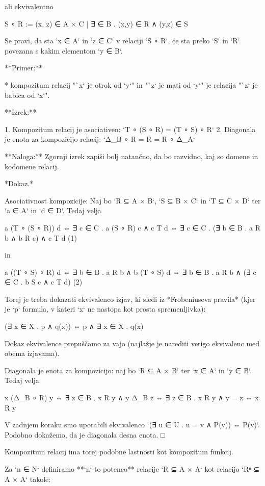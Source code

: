 ali ekvivalentno

    S ∘ R := { (x, z) ∈ A × C | ∃ ∈ B . (x,y) ∈ R ∧ (y,z) ∈ S }

Se pravi, da sta `x ∈ A` in `z ∈ C` v relaciji `S ∘ R`, če sta preko `S` in `R`
povezana s kakim elementom `y ∈ B`.

**Primer:**

* kompozitum relacij "`x` je otrok od `y`" in "`z` je mati od `y`" je relacija
  "`z` je babica od `x`".

**Izrek:**

1. Kompozitum relacij je asociativen: `T ∘ (S ∘ R) = (T ∘ S) ∘ R`
2. Diagonala je enota za kompozicijo relacij: `Δ_B ∘ R = R = R ∘ Δ_A`

**Naloga:** Zgornji izrek zapiši bolj natančno, da bo razvidno, kaj so domene in kodomene relacij.

*Dokaz.*

Asociativnost kompozicije: Naj bo `R ⊆ A × B`, `S ⊆ B × C` in `T ⊆ C × D` ter `a ∈ A` in `d ∈ D`. Tedaj velja

    a (T ∘ (S ∘ R)) d                            ⇔
    ∃ c ∈ C . a (S ∘ R) c ∧ c T d                ⇔
    ∃ c ∈ C . (∃ b ∈ B . a R b ∧ b R c) ∧ c T d  (1)

in

    a ((T ∘ S) ∘ R) d                            ⇔
    ∃ b ∈ B . a R b ∧ b (T ∘ S) d                ⇔
    ∃ b ∈ B . a R b ∧ (∃ c ∈ C . b S c ∧ c T d)  (2)

Torej je treba dokazati ekvivalenco izjav, ki sledi iz *Frobeniuseva pravila*
(kjer je `p` formula, v kateri `x` ne nastopa kot prosta spremenljivka):

    (∃ x ∈ X . p ∧ q(x)) ⇔ p ∧ ∃ x ∈ X . q(x)

Dokaz ekvivalence prepuščamo za vajo (najlažje je narediti verigo ekvivalenc med obema izjavama).

Diagonala je enota za kompozicijo: naj bo `R ⊆ A × B` ter `x ∈ A` in `y ∈ B`. Tedaj velja

    x (Δ_B ∘ R) y                ⇔
    ∃ z ∈ B . x R y ∧ y Δ_B z    ⇔
    ∃ z ∈ B . x R y ∧ y = z      ⇔
    x R y

V zadnjem koraku smo uporabili ekvivalenco `(∃ u ∈ U . u = v ∧ P(v)) ⇔ P(v)`.
Podobno dokažemo, da je diagonala desna enota. □

Kompozitum relacij ima torej podobne lastnosti kot kompozitum funkcij.

Za `n ∈ N` definiramo **`n`-to potenco** relacije `R ⊆ A × A` kot relacijo `Rⁿ
⊆ A × A` takole:

